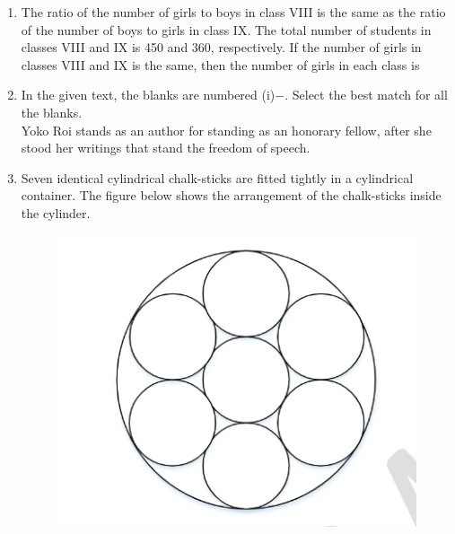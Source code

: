 \documentclass[journal,12pt,onecolumn]{IEEEtran}
\theoremstyle{remark}
\begin{document}
\begin{enumerate}
\item  The ratio of the number of girls to boys in class VIII is the same as the ratio of the number of boys to girls in class IX. The total number of students  in classes VIII and IX is 450 and 360, respectively. If the number of girls in classes VIII and IX is the same, then the number of girls in each class is
\begin{enumerate}
\end{enumerate}
\hfill{}
\item  In the given text, the blanks are numbered (i)$-$. Select the best match for all the blanks. \\
Yoko Roi stands \underline{} as an author for standing \underline{} as an honorary fellow, after she stood \underline{} her writings that stand \underline{} the freedom of speech.
\begin{enumerate}
\end{enumerate}
\hfill{}



 \item Seven identical cylindrical chalk-sticks are fitted tightly in a cylindrical container. The figure below shows the arrangement of the chalk-sticks inside the cylinder.
 \begin{figure}[h]
     \centering
     \includegraphics[width=0.5\columnwidth]{figs/im 1.jpeg}
     \caption{}
     \label{fig:placeholder}
 \end{figure}


\end{enumerate}
\end{document}
